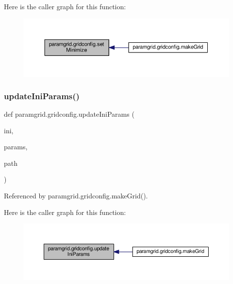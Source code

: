 Here is the caller graph for this function\+:
\nopagebreak
\begin{figure}[H]
\begin{center}
\leavevmode
\includegraphics[width=350pt]{namespaceparamgrid_1_1gridconfig_a914c9c48fd66faa640b61db278b94e2a_icgraph}
\end{center}
\end{figure}
\mbox{\label{namespaceparamgrid_1_1gridconfig_a56b6075773881b0ed15f57a591988ac0}} 
\subsubsection{\texorpdfstring{update\+Ini\+Params()}{updateIniParams()}}
{\footnotesize\ttfamily def paramgrid.\+gridconfig.\+update\+Ini\+Params (\begin{DoxyParamCaption}\item[{}]{ini,  }\item[{}]{params,  }\item[{}]{path }\end{DoxyParamCaption})}



Referenced by paramgrid.\+gridconfig.\+make\+Grid().

Here is the caller graph for this function\+:
\nopagebreak
\begin{figure}[H]
\begin{center}
\leavevmode
\includegraphics[width=350pt]{namespaceparamgrid_1_1gridconfig_a56b6075773881b0ed15f57a591988ac0_icgraph}
\end{center}
\end{figure}


